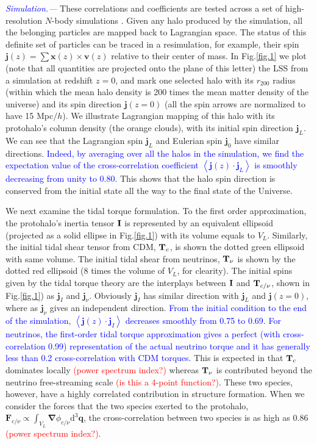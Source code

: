 \documentclass[aps,prd,twocolumn,amsmath,amssymb,amsfont,superscriptaddress]{revtex4-1}
\newcommand{\bs}{\boldsymbol}
\newcommand{\diff}{{\mathrm d}}
\newcommand{\tcb}{\textcolor{blue}}
\newcommand{\tcr}{\textcolor{red}}
\begin{document}
\tcb{\textit{Simulation.---}}
These correlations and coefficients are tested across a set of high-resolution $N$-body simulations \citep{2018ApJS..237...24Y}. Given any halo produced by the simulation, all the belonging particles are mapped back to Lagrangian space. The status of this definite set of particles can be traced in a resimulation, for example, their spin $\bs{j}(z)=\sum\bs{x}(z)\times\bs{v}(z)$ relative to their center of mass. In Fig.\ref{fig.1} we plot (note that all quantities are projected onto the plane of this letter) the LSS from a simulation at redshift $z=0$, and mark one selected halo with its $r_{200}$ radius (within which the mean halo density is 200 times the mean matter density of the universe) and its spin direction $\bs{j}(z=0)$ (all the spin arrows are normalized to have 15 Mpc$/h$). 
We illustrate Lagrangian mapping of this halo with its protohalo's column density (the orange clouds), with its initial spin direction $\bs{j}_L$. We can see that the Lagrangian spin $\bs{j}_L$ and Eulerian spin $\bs{j}_0$ have similar directions. \tcb{Indeed, by averaging over all the halos in the simulation, we find the expectation value of the cross-correlation coefficient $\left\langle \bs{j}(z) \cdot \bs{j}_L \right\rangle$ is smoothly decreasing from unity to 0.80.} This shows that the halo spin direction is conserved from the initial state all the way to the final state of the Universe.

We next examine the tidal torque formulation. To the first order approximation, the protohalo's inertia tensor $\bold{I}$ is represented by an equivalent ellipsoid (projected as a solid ellipse in Fig.\ref{fig.1}) with its volume equals to $V_L$.
Similarly, the initial tidal shear tensor from CDM, $\bold{T}_c$, is shown the dotted green ellipsoid with same volume. The initial tidal shear from neutrinos, $\bold{T}_\nu$ is shown by the dotted red ellipsoid (8 times the volume of $V_L$, for clearity). The initial spins given by the tidal torque theory are the interplays between $\bold{I}$ and $\bold{T}_{c/\nu}$, shown in Fig.\ref{fig.1}) as $\bs{j}_I$ and $\bs{j}_\nu$. Obviously $\bs{j}_I$ has similar direction with $\bs{j}_L$ and $\bs{j}(z=0)$, where as $\bs{j}_\nu$ gives an independent direction. \tcb{From the initial condition to the end of the simulation, $\left\langle \bs{j}(z) \cdot \bs{j}_I \right\rangle$ decreases smoothly from 0.75 to 0.69. For neutrinos, the first-order tidal torque approximation gives a perfect (with cross-correlation 0.99) representation of the actual neutrino torque and it has generally less than 0.2 cross-correlation with CDM torques.} This is expected in that $\bold{T}_c$ dominates locally \tcr{(power spectrum index?)} whereas $\bold{T}_\nu$ is contributed beyond the neutrino free-streaming scale \tcr{(is this a 4-point function?)}. These two species, however, have a highly correlated contribution in structure formation. When we consider the forces that the two species exerted to the protohalo, $\bs{F}_{c/\nu}\propto\int_{V_L}\bs{\nabla}\phi_{c/\nu}\diff^3\bs{q}$, the cross-correlation between two species is as high as 0.86 \tcr{(power spectrum index?)}.
\end{document}
